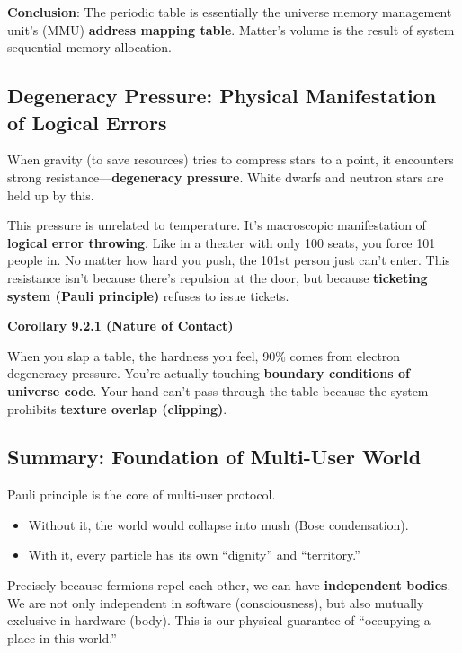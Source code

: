 \textbf{Conclusion}:
The periodic table is essentially the universe memory management unit's (MMU) \textbf{address mapping table}. Matter's volume is the result of system sequential memory allocation.

\subsection{Degeneracy Pressure: Physical Manifestation of Logical Errors}

When gravity (to save resources) tries to compress stars to a point, it encounters strong resistance---\textbf{degeneracy pressure}.
White dwarfs and neutron stars are held up by this.

This pressure is unrelated to temperature. It's macroscopic manifestation of \textbf{logical error throwing}.
Like in a theater with only 100 seats, you force 101 people in.
No matter how hard you push, the 101st person just can't enter.
This resistance isn't because there's repulsion at the door, but because \textbf{ticketing system (Pauli principle)} refuses to issue tickets.

\textbf{Corollary 9.2.1 (Nature of Contact)}

When you slap a table, the hardness you feel, 90\% comes from electron degeneracy pressure.
You're actually touching \textbf{boundary conditions of universe code}.
Your hand can't pass through the table because the system prohibits \textbf{texture overlap (clipping)}.

\subsection{Summary: Foundation of Multi-User World}

Pauli principle is the core of multi-user protocol.
\begin{itemize}
\item Without it, the world would collapse into mush (Bose condensation).
\item With it, every particle has its own ``dignity'' and ``territory.''
\end{itemize}

Precisely because fermions repel each other, we can have \textbf{independent bodies}. We are not only independent in software (consciousness), but also mutually exclusive in hardware (body). This is our physical guarantee of ``occupying a place in this world.''
